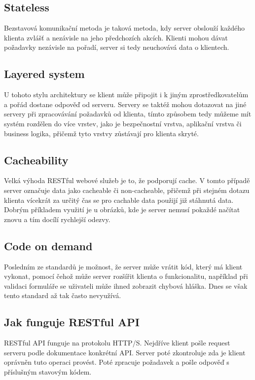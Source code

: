 \subsection{Stateless}
Bezstavová komunikační metoda je taková metoda, kdy server obslouží každého klienta zvlášť a nezávisle na jeho předchozích akcích. Klienti mohou dávat požadavky nezávisle na pořadí, server si tedy neuchovává data o klientech.

\subsection{Layered system}
U tohoto stylu architektury se klient může připojit i k jiným zprostředkovatelům a pořád dostane odpověď od serveru. Servery se taktéž mohou dotazovat na jiné servery při zpracovávání požadavků od klienta, tímto způsobem tedy můžeme mít systém rozdělen do více vrstev, jako je bezpečnostní vrstva, aplikační vrstva či business logika, přičemž tyto vrstvy zůstávají pro klienta skryté.

\subsection{Cacheability}
Velká výhoda RESTful webové služeb je to, že podporují cache. V tomto případě server označuje data jako cacheable či non-cacheable, přičemž při stejném dotazu klienta vícekrát za určitý čas se pro cachable data použijí již stáhnutá data. Dobrým příkladem využití je u obrázků, kde je server nemusí pokaždé načítat znovu a tím docílí rychlejší odezvy.

\subsection{Code on demand}
Posledním ze standardů je možnost, že server může vrátit kód, který má klient vykonat, pomocí čehož může server rozšířit klienta o funkcionalitu, například při validaci formuláře se uživateli může ihned zobrazit chybová hláška. Dnes se však tento standard až tak často nevyužívá.


\subsection{Jak funguje RESTful API} %
RESTful API funguje na protokolu HTTP/S. Nejdříve klient pošle request serveru podle dokumentace konkrétní API. Server poté zkontroluje zda je klient oprávněn tuto operaci provést. Poté zpracuje požadavek a pošle odpověď s příslušným stavovým kódem.

